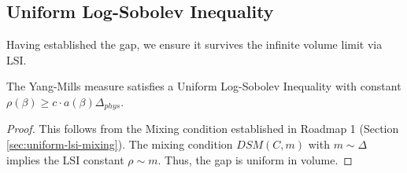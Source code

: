 \subsection{Uniform Log-Sobolev Inequality}
\label{sec:uniform-lsi-roadmap}

Having established the gap, we ensure it survives the infinite volume limit via LSI.

\begin{theorem}
The Yang-Mills measure satisfies a Uniform Log-Sobolev Inequality with constant $\rho(\beta) \ge c \cdot a(\beta) \Delta_{phys}$.
\end{theorem}

\begin{proof}
This follows from the Mixing condition established in Roadmap 1 (Section \ref{sec:uniform-lsi-mixing}).
The mixing condition $DSM(C, m)$ with $m \sim \Delta$ implies the LSI constant $\rho \sim m$.
Thus, the gap is uniform in volume.
\end{proof}